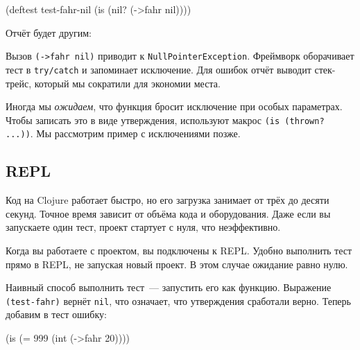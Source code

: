 \begin{english}
  \begin{clojure}
(deftest test-fahr-nil
  (is (nil? (->fahr nil))))
  \end{clojure}
\end{english}

\noindent
Отчёт будет другим:

\begin{english}
\end{english}


Вызов \verb|(->fahr nil)| приводит к \verb|NullPointerException|. Фреймворк
оборачивает тест в \verb|try/catch| и запоминает исключение. Для ошибок отчёт
выводит стек-трейс, который мы сократили для экономии места.

Иногда мы \emph{ожидаем}, что функция бросит исключение при особых
параметрах. Чтобы записать это в виде утверждения, используют макрос
\verb|(is (thrown? ...))|. Мы рассмотрим пример с исключениями позже.

\subsection{REPL}


Код на Clojure работает быстро, но его загрузка занимает от трёх до десяти
секунд. Точное время зависит от объёма кода и оборудования. Даже если вы
запускаете один тест, проект стартует с нуля, что неэффективно.

Когда вы работаете с проектом, вы подключены к REPL. Удобно выполнить тест прямо
в REPL, не запуская новый проект. В этом случае ожидание равно нулю.

Наивный способ выполнить тест~--- запустить его как функцию. Выражение
\verb|(test-fahr)| вернёт \verb|nil|, что означает, что утверждения
сработали верно. Теперь добавим в тест ошибку:

\begin{english}
  \begin{clojure}
(is (= 999 (int (->fahr 20))))
  \end{clojure}
\end{english}

